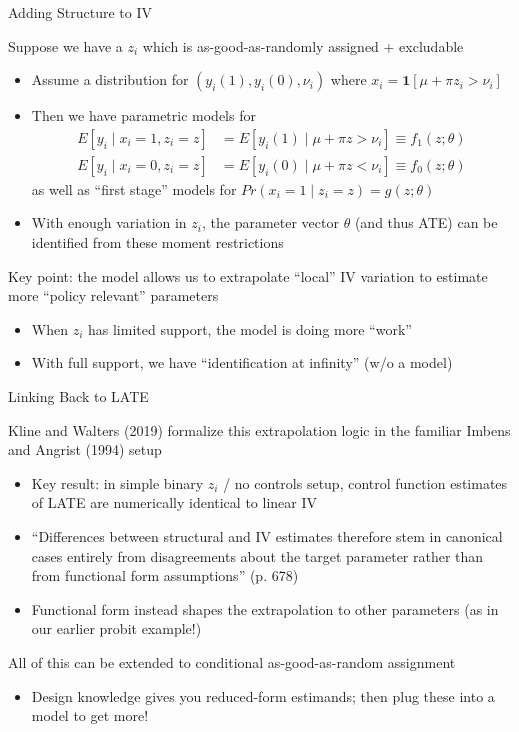 \documentclass[11pt,english]{beamer}
\begin{document}
\begin{frame}{Adding Structure to IV}

Suppose we have a $z_i$ which is as-good-as-randomly assigned + excludable\smallskip
\begin{itemize}
\item Assume a distribution for $(y_i(1),y_i(0),\nu_i)$ where $x_i=\mathbf{1}[\mu+\pi z_i>\nu_i]$\smallskip\pause{}
\item Then we have parametric models for
\begin{align*}
E[y_i\mid x_i=1,z_i=z]&=E[y_i(1)\mid \mu+\pi z>\nu_i]\equiv f_1(z;\theta)\\
E[y_i\mid x_i=0,z_i=z]&=E[y_i(0)\mid \mu+\pi z<\nu_i]\equiv f_0(z;\theta)
\end{align*}
as well as ``first stage'' models for $Pr(x_i=1\mid z_i=z)=g(z;\theta)$ \pause{}\medskip
\item With enough variation in $z_i$, the parameter vector $\theta$ (and thus ATE) can be identified from these moment restrictions 
\end{itemize}\bigskip\pause{}

Key point: the model allows us to extrapolate ``local'' IV variation to estimate more ``policy relevant'' parameters\smallskip
\begin{itemize}
\item When $z_i$ has limited support, the model is doing more ``work''\smallskip
\item With full support, we have ``identification at infinity'' (w/o a model)
\end{itemize}

\end{frame}

\begin{frame}{Linking Back to LATE}

\vspace{0.2cm}
Kline and Walters (2019) formalize this extrapolation logic in the familiar Imbens and Angrist (1994) setup\smallskip
\begin{itemize}
\item Key result: in simple binary $z_i$ / no controls setup, control function estimates of LATE are numerically identical to linear IV\smallskip\pause{}
\item ``Differences between structural and IV estimates therefore stem in canonical cases entirely from disagreements about the target parameter rather than from functional form assumptions'' (p. 678)\smallskip\pause{}
\item Functional form instead shapes the extrapolation to other parameters (as in our earlier probit example!)
\end{itemize}\bigskip\pause{}

All of this can be extended to conditional as-good-as-random assignment 
\begin{itemize}
\item Design knowledge gives you reduced-form estimands; then plug these into a model to get more!
\end{itemize}

\end{frame}
\end{document}
